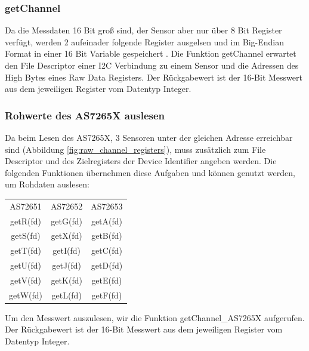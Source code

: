 \subsubsection{getChannel}
Da die Messdaten 16 Bit groß sind, der Sensor aber nur über 8 Bit Register verfügt, werden 2 aufeinader folgende Register ausgelsen und im Big-Endian Format in einer 16 Bit Variable gespeichert .
Die Funktion getChannel erwartet den File Descriptor einer I2C Verbindung zu einem Sensor und die Adressen des High Bytes eines Raw Data Registers.
Der Rückgabewert ist der 16-Bit Messwert aus dem jeweiligen Register vom Datentyp Integer.\\



\subsubsection{Rohwerte des AS7265X auslesen}\label{Rohwerte-des-AS7265X-Auslesen}
Da beim Lesen des AS7265X, 3 Sensoren unter der gleichen Adresse erreichbar sind (Abbildung \ref{fig:raw_channel_registers}), muss zusätzlich zum File Descriptor und des Zielregisters der Device Identifier angeben werden.
Die folgenden Funktionen übernehmen diese Aufgaben und können genutzt werden, um Rohdaten auslesen:
\begin{center}
\begin{tabular}{ c c c }
 	AS72651 & AS72652 & AS72653 \\ 
 	getR(fd) & getG(fd) & getA(fd) \\  
 	getS(fd) & getX(fd) & getB(fd) \\
 	getT(fd) & getI(fd) & getC(fd) \\  
 	getU(fd) & getJ(fd) & getD(fd) \\
 	getV(fd) & getK(fd) & getE(fd) \\  
 	getW(fd) & getL(fd) & getF(fd) \\
\end{tabular}
\end{center}
Um den Messwert auszulesen, wir die Funktion getChannel\_AS7265X aufgerufen.\\
Der Rückgabewert ist der 16-Bit Messwert aus dem jeweiligen Register vom Datentyp Integer.\\

%

